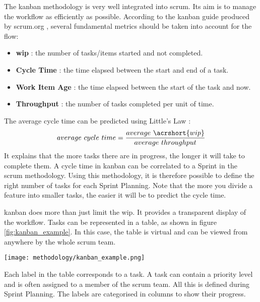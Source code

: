 The \gls{kanban} methodology is very well integrated into \gls{scrum}. Its aim is to manage the workflow as efficiently as possible. According to the \gls{kanban} guide produced by \gls{scrum}.org \cite{kanban_guide}, several fundamental metrics should be taken into account for the flow:
\begin{itemize}
    \item \textbf{\acrfull{wip}} : the number of tasks/items started and not completed.
    \item \textbf{Cycle Time} : the time elapsed between the start and end of a task.
    \item \textbf{Work Item Age} : the time elapsed between the start of the task and now.
    \item \textbf{Throughput} : the number of tasks completed per unit of time.
\end{itemize}
The average cycle time can be predicted using Little's Law \cite{little_law}:
\begin{equation}
    average\ cycle\ time = \frac{average\ \acrshort{wip}}{average\ throughput}
\end{equation}
It explains that the more tasks there are in progress, the longer it will take to complete them. A cycle time in \gls{kanban} can be correlated to a Sprint in the \gls{scrum} methodology. Using this methodology, it is therefore possible to define the right number of tasks for each Sprint Planning. Note that the more you divide a feature into smaller tasks, the easier it will be to predict the cycle time.

\gls{kanban} does more than just limit the \acrshort{wip}. It provides a transparent display of the workflow. Tasks can be represented in a table, as shown in figure \ref{fig:kanban_example}. In this case, the table is virtual and can be viewed from anywhere by the whole \gls{scrum} team.
\begin{center}
    \begingroup
    \texttt{[image: methodology/kanban\_example.png]}
    \label{fig:kanban_example}
    \endgroup
\end{center}
Each label in the table corresponds to a task. A task can contain a priority level and is often assigned to a member of the \gls{scrum} team. All this is defined during Sprint Planning. The labels are categorised in columns to show their progress.


